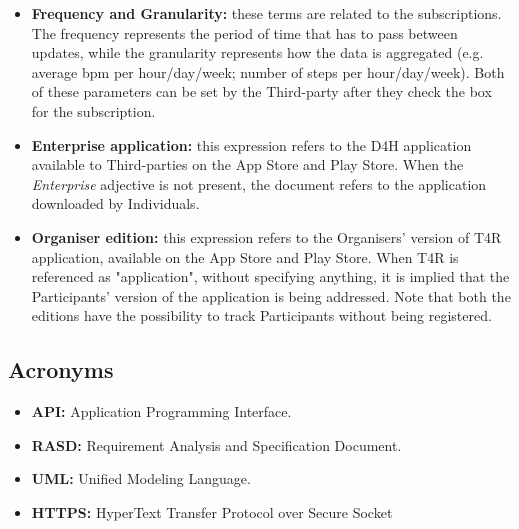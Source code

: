\begin{itemize}
            \item \textbf{Frequency and Granularity:} these terms are related to the subscriptions. The frequency represents the period of time that has to pass between updates, while the granularity represents how the data is aggregated (e.g. average bpm per hour/day/week; number of steps per hour/day/week). Both of these parameters can be set by the Third-party after they check the box for the subscription.
            
            \item \textbf{Enterprise application:} this expression refers to the D4H application available to Third-parties on the App Store and Play Store. When the \emph{Enterprise} adjective is not present, the document refers to the application downloaded by Individuals.
            
            \item \textbf{Organiser edition:} this expression refers to the Organisers' version of T4R application, available on the App Store and Play Store. When T4R is referenced as "application", without specifying anything, it is implied that the Participants' version of the application is being addressed. Note that both the editions have the possibility to track Participants without being registered.
        \end{itemize}
        
    \subsection{Acronyms}
        \begin{itemize}
            \item \textbf{API:} Application Programming Interface.
        
            \item \textbf{RASD:} Requirement Analysis and Specification Document.
            
            \item \textbf{UML:} Unified Modeling Language.
            
            \item \textbf{HTTPS:} HyperText Transfer Protocol over Secure Socket 
        \end{itemize}
        
